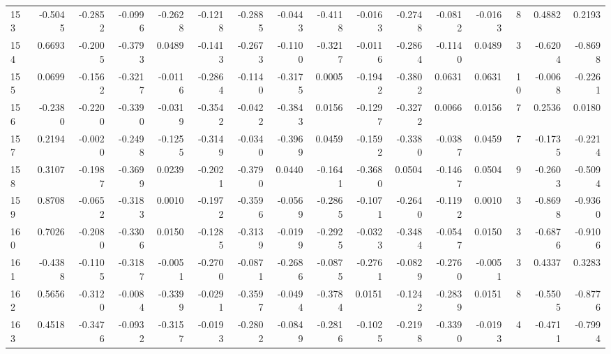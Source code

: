 \begin{tabular}{lrrrrrrrrrrrrrrr}
153 &     -0.5045 & -0.2852 & -0.0996 & -0.2628 & -0.1218 & -0.2885 & -0.0443 & -0.4118 & -0.0163 & -0.2748 &  -0.0812 &    -0.0163 &      8 &                    0.4882 &                     0.2193 \\
154 &      0.6693 & -0.2005 & -0.3793 &  0.0489 & -0.1413 & -0.2673 & -0.1100 & -0.3217 & -0.0116 & -0.2864 &  -0.1140 &     0.0489 &      3 &                   -0.6204 &                    -0.8698 \\
155 &      0.0699 & -0.1562 & -0.3217 & -0.0116 & -0.2864 & -0.1140 & -0.3175 &  0.0005 & -0.1942 & -0.3802 &   0.0631 &     0.0631 &     10 &                   -0.0068 &                    -0.2261 \\
156 &     -0.2380 & -0.2200 & -0.3390 & -0.0319 & -0.3542 & -0.0422 & -0.3843 &  0.0156 & -0.1297 & -0.3272 &   0.0066 &     0.0156 &      7 &                    0.2536 &                     0.0180 \\
157 &      0.2194 & -0.0020 & -0.2498 & -0.1255 & -0.3149 & -0.0340 & -0.3969 &  0.0459 & -0.1592 & -0.3380 &  -0.0387 &     0.0459 &      7 &                   -0.1735 &                    -0.2214 \\
158 &      0.3107 & -0.1987 & -0.3699 &  0.0239 & -0.2021 & -0.3790 &  0.0440 & -0.1641 & -0.3680 &  0.0504 &  -0.1467 &     0.0504 &      9 &                   -0.2603 &                    -0.5094 \\
159 &      0.8708 & -0.0652 & -0.3183 &  0.0010 & -0.1972 & -0.3596 & -0.0569 & -0.2865 & -0.1071 & -0.2640 &  -0.1192 &     0.0010 &      3 &                   -0.8698 &                    -0.9360 \\
160 &      0.7026 & -0.2080 & -0.3306 &  0.0150 & -0.1285 & -0.3139 & -0.0199 & -0.2925 & -0.0323 & -0.3484 &  -0.0547 &     0.0150 &      3 &                   -0.6876 &                    -0.9106 \\
161 &     -0.4388 & -0.1105 & -0.3187 & -0.0051 & -0.2700 & -0.0871 & -0.2686 & -0.0875 & -0.2761 & -0.0829 &  -0.2760 &    -0.0051 &      3 &                    0.4337 &                     0.3283 \\
162 &      0.5656 & -0.3120 & -0.0084 & -0.3399 & -0.0291 & -0.3597 & -0.0494 & -0.3784 &  0.0151 & -0.1242 &  -0.2839 &     0.0151 &      8 &                   -0.5505 &                    -0.8776 \\
163 &      0.4518 & -0.3476 & -0.0932 & -0.3157 & -0.0193 & -0.2802 & -0.0849 & -0.2816 & -0.1025 & -0.2198 &  -0.3390 &    -0.0193 &      4 &                   -0.4711 &                    -0.7994 \\

\end{tabular}
